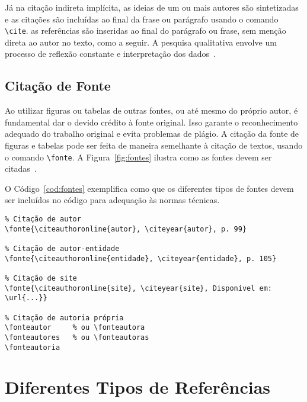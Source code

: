 \documentclass[
    12pt
    ,oneside
    ,a4paper
    ,chapter=TITLE
    ,section=TITLE
    ,sumario=abnt-6027-2012]{abntex2}
\begin{document}
Já na citação indireta implícita, as ideias de um ou mais autores são sintetizadas e as citações são incluídas ao final da frase ou parágrafo usando o comando \texttt{\textbackslash cite}. as referências são inseridas ao final do parágrafo ou frase, sem menção direta ao autor no texto, como a seguir. A pesquisa qualitativa envolve um processo de reflexão constante e interpretação dos dados~\cite{creswell}.

\subsection{Citação de Fonte}

Ao utilizar figuras ou tabelas de outras fontes, ou até mesmo do próprio autor, é fundamental dar o devido crédito à fonte original. Isso garante o reconhecimento adequado do trabalho original e evita problemas de plágio. A citação da fonte de figuras e tabelas pode ser feita de maneira semelhante à citação de textos, usando o comando \texttt{\textbackslash fonte}. A Figura~\ref{fig:fontes} ilustra como as fontes devem ser citadas~\cite{utp_normas2024}.

\begin{figure}[htb]
\end{figure}

O Código~\ref{cod:fontes} exemplifica como que os diferentes tipos de fontes devem ser incluídos no código para adequação às normas técnicas.

\begin{codigo}[htb]
\begin{lstlisting}
% Citação de autor
\fonte{\citeauthoronline{autor}, \citeyear{autor}, p. 99}

% Citação de autor-entidade
\fonte{\citeauthoronline{entidade}, \citeyear{entidade}, p. 105}

% Citação de site
\fonte{\citeauthoronline{site}, \citeyear{site}, Disponível em: \url{...}}

% Citação de autoria própria 
\fonteautor     % ou \fonteautora
\fonteautores   % ou \fonteautoras
\fonteautoria
\end{lstlisting}
\fonteautor
\end{codigo}

\section{Diferentes Tipos de Referências}
\end{document}
